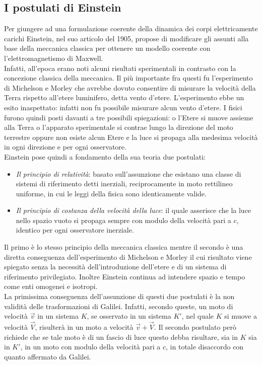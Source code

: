 \subsection{I postulati di Einstein}\label{Sec:postulati}
Per giungere ad una formulazione coerente della dinamica dei corpi elettricamente carichi Einstein, nel suo articolo \cite{Einstein1905} del 1905, propose di modificare gli assunti alla base della meccanica classica per ottenere un modello coerente con l'elettromagnetismo di Maxwell.\\Infatti, all'epoca erano noti alcuni risultati sperimentali in contrasto con la concezione classica della meccanica. Il più importante fra questi fu l'esperimento di Michelson e Morley che avrebbe dovuto consentire di misurare la velocità della Terra rispetto all'etere luminifero, detta vento d'etere. L'esperimento ebbe un esito inaspettato: infatti non fu possibile misurare alcun vento d'etere. I fisici furono quindi posti davanti a tre possibili spiegazioni: o l'Etere si muove assieme alla Terra o l'apparato sperimentale si contrae lungo la direzione del moto terrestre oppure non esiste alcun Etere e la luce si propaga alla medesima velocità in ogni direzione e per ogni osservatore.\\
Einstein pose quindi a fondamento della sua teoria due postulati:
\begin{itemize}
    \item \emph{Il principio di relatività}: basato sull'assunzione che esistano  una classe di sistemi di riferimento detti inerziali, reciprocamente in moto rettilineo uniforme, in cui le leggi della fisica sono identicamente valide.
    \item \emph{Il principio di costanza della velocità della luce}: il quale asserisce che la luce nello spazio vuoto si propaga sempre con modulo della velocità pari a $c$, identico per ogni osservatore inerziale. 
\end{itemize}
Il primo è lo stesso principio della meccanica classica mentre il secondo è una diretta conseguenza dell'esperimento di Michelson e Morley il cui risultato viene spiegato senza la necessità dell'introduzione dell'etere e di un sistema di riferimento privilegiato. Inoltre Einstein continua ad intendere spazio e tempo come enti omogenei e isotropi.\\

La primissima conseguenza dell'assunzione di questi due postulati è la non validità delle trasformazioni di Galilei. Infatti, secondo queste, un moto di velocità $\vec{v}$ in un sistema $K$, se osservato in un sistema $K'$, nel quale $K$ si muove a velocità $\vec{V}$, risulterà in un moto a velocità $\vec{v}+\vec{V}$. Il secondo postulato però richiede che se tale moto è di un fascio di luce questo debba risultare, sia in $K$ sia in $K'$, in un moto con modulo della velocità pari a $c$, in totale disaccordo con quanto affermato da Galilei.\\

